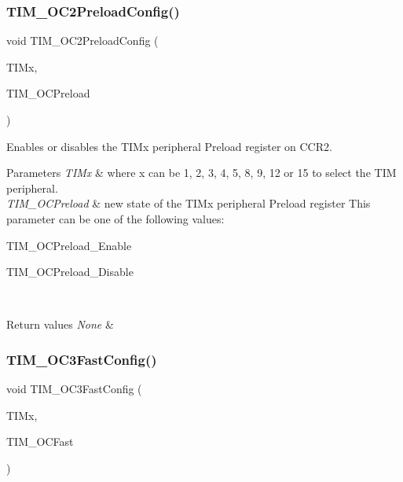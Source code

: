 \subsubsection{\texorpdfstring{TIM\_OC2PreloadConfig()}{TIM\_OC2PreloadConfig()}}
{\footnotesize\ttfamily void T\+I\+M\+\_\+\+O\+C2\+Preload\+Config (\begin{DoxyParamCaption}\item[{\mbox{\hyperlink{struct_t_i_m___type_def}{T\+I\+M\+\_\+\+Type\+Def}} $\ast$}]{T\+I\+Mx,  }\item[{uint16\+\_\+t}]{T\+I\+M\+\_\+\+O\+C\+Preload }\end{DoxyParamCaption})}



Enables or disables the T\+I\+Mx peripheral Preload register on C\+C\+R2. 


\begin{DoxyParams}{Parameters}
{\em T\+I\+Mx} & where x can be 1, 2, 3, 4, 5, 8, 9, 12 or 15 to select the T\+IM peripheral. \\
\hline
{\em T\+I\+M\+\_\+\+O\+C\+Preload} & new state of the T\+I\+Mx peripheral Preload register This parameter can be one of the following values\+: \begin{DoxyItemize}
\item T\+I\+M\+\_\+\+O\+C\+Preload\+\_\+\+Enable \item T\+I\+M\+\_\+\+O\+C\+Preload\+\_\+\+Disable \end{DoxyItemize}
\\
\hline
\end{DoxyParams}

\begin{DoxyRetVals}{Return values}
{\em None} & \\
\hline
\end{DoxyRetVals}
\mbox{\label{group___t_i_m___exported___functions_gab2f3698e6e56bd9b0a4be7056ba789e1}} 
\subsubsection{\texorpdfstring{TIM\_OC3FastConfig()}{TIM\_OC3FastConfig()}}
{\footnotesize\ttfamily void T\+I\+M\+\_\+\+O\+C3\+Fast\+Config (\begin{DoxyParamCaption}\item[{\mbox{\hyperlink{struct_t_i_m___type_def}{T\+I\+M\+\_\+\+Type\+Def}} $\ast$}]{T\+I\+Mx,  }\item[{uint16\+\_\+t}]{T\+I\+M\+\_\+\+O\+C\+Fast }\end{DoxyParamCaption})}



